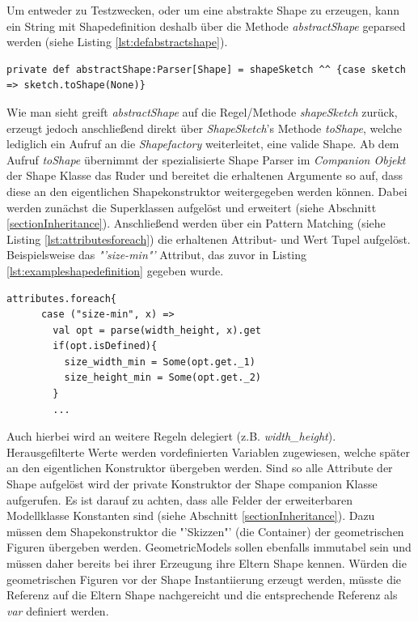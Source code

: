Um entweder zu Testzwecken, oder um eine abstrakte Shape zu erzeugen, kann ein String mit Shapedefinition deshalb über die Methode \textit{abstractShape} geparsed werden (siehe Listing \ref{lst:defabstractshape}).
\begin{lstlisting}[style=scala, caption = {Methode zum direkten Parsen von Shapes}, label = {lst:defabstractshape}]
private def abstractShape:Parser[Shape] = shapeSketch ^^ {case sketch => sketch.toShape(None)}
\end{lstlisting}Wie man sieht greift \textit{abstractShape} auf die Regel/Methode \textit{shapeSketch} zurück, erzeugt jedoch anschließend direkt über \textit{ShapeSketch}'s Methode \textit{toShape}, welche lediglich ein Aufruf an die \textit{Shapefactory} weiterleitet, eine valide Shape. Ab dem Aufruf \textit{toShape} übernimmt der spezialisierte Shape Parser im \textit{Companion Objekt} der Shape Klasse das Ruder und bereitet die erhaltenen Argumente so auf, dass diese an den eigentlichen Shapekonstruktor weitergegeben werden können. Dabei werden zunächst die Superklassen aufgelöst und erweitert (siehe Abschnitt \ref{sectionInheritance}). Anschließend werden über ein Pattern Matching (siehe Listing \ref{lst:attributesforeach}) die erhaltenen Attribut- und Wert Tupel aufgelöst. Beispielsweise das \textit{"'size-min"'} Attribut, das zuvor in Listing \ref{lst:exampleshapedefinition} gegeben wurde. 
\begin{lstlisting}[style=scala, caption = {Iterieren durch Attribute mit Pattern Matching}, label = {lst:attributesforeach}]
attributes.foreach{
      case ("size-min", x) =>
        val opt = parse(width_height, x).get
        if(opt.isDefined){
          size_width_min = Some(opt.get._1)
          size_height_min = Some(opt.get._2)
        }
        ...
\end{lstlisting}Auch hierbei wird an weitere Regeln delegiert (z.B. \textit{width\_height}). Herausgefilterte Werte werden vordefinierten Variablen zugewiesen, welche später an den eigentlichen Konstruktor übergeben werden. Sind so alle Attribute der Shape aufgelöst wird der private Konstruktor der Shape companion Klasse aufgerufen. Es ist darauf zu achten, dass alle Felder der erweiterbaren Modellklasse Konstanten sind (siehe Abschnitt \ref{sectionInheritance}). Dazu müssen dem Shapekonstruktor die "'Skizzen"' (die Container) der geometrischen Figuren übergeben werden. GeometricModels sollen ebenfalls immutabel sein und müssen daher bereits bei ihrer Erzeugung ihre Eltern Shape kennen. Würden die geometrischen Figuren vor der Shape Instantiierung erzeugt werden, müsste die Referenz auf die Eltern Shape nachgereicht  und die entsprechende Referenz als \textit{var} definiert werden.
